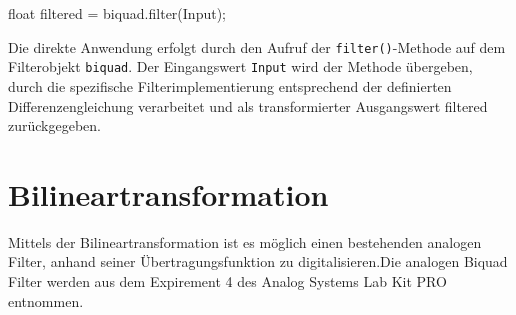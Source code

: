 \documentclass[
  ngerman,
  letterpaper,
  DIV=11]{scrreprt}
\newenvironment{Shaded}{\begin{snugshade}}{\end{snugshade}}
\newcommand{\DataTypeTok}[1]{\textcolor[rgb]{0.68,0.00,0.00}{#1}}
\newcommand{\NormalTok}[1]{\textcolor[rgb]{0.00,0.23,0.31}{#1}}
\newcommand{\OperatorTok}[1]{\textcolor[rgb]{0.37,0.37,0.37}{#1}}
\begin{document}
\begin{Shaded}
\begin{Highlighting}[]
\DataTypeTok{float}\NormalTok{ filtered }\OperatorTok{=}\NormalTok{ biquad}\OperatorTok{.}\NormalTok{filter}\OperatorTok{(}\NormalTok{Input}\OperatorTok{);}
\end{Highlighting}
\end{Shaded}

Die direkte Anwendung erfolgt durch den Aufruf der
\texttt{filter()}-Methode auf dem Filterobjekt \texttt{biquad}. Der
Eingangswert \texttt{Input} wird der Methode übergeben, durch die
spezifische Filterimplementierung entsprechend der definierten
Differenzengleichung verarbeitet und als transformierter Ausgangswert
filtered zurückgegeben.

\section{Bilineartransformation}\label{bilineartransformation}

Mittels der Bilineartransformation ist es möglich einen bestehenden
analogen Filter, anhand seiner Übertragungsfunktion zu
digitalisieren.Die analogen Biquad Filter werden aus dem Expirement 4
des Analog Systems Lab Kit PRO entnommen.
\end{document}
